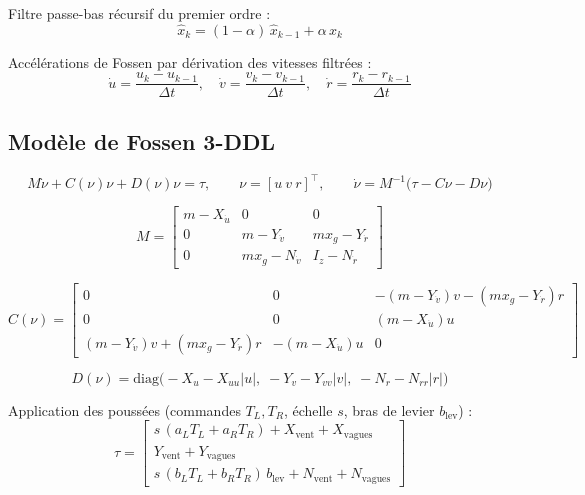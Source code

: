 \documentclass{rapportEILCO}
\begin{document}
\begin{appendix}
		Filtre passe-bas récursif du premier ordre :
		\begin{equation}
			\hat{x}_{k} = (1-\alpha)\,\hat{x}_{k-1} + \alpha\, x_{k}
			\label{eq:lpf}
		\end{equation}
		
		Accélérations de Fossen par dérivation des vitesses filtrées :
		\begin{equation}
			\dot{u} = \frac{u_{k}-u_{k-1}}{\Delta t},\quad
			\dot{v} = \frac{v_{k}-v_{k-1}}{\Delta t},\quad
			\dot{r} = \frac{r_{k}-r_{k-1}}{\Delta t}
			\label{eq:accels}
		\end{equation}
		
		\subsection{Modèle de Fossen 3-DDL}
		\label{app:fossen}
		
		\begin{equation}
			M\dot{\nu} + C(\nu)\nu + D(\nu)\nu = \tau,\qquad
			\nu=[u\ v\ r]^{\top},\qquad
			\dot{\nu} = M^{-1}\big(\tau - C\nu - D\nu\big)
			\label{eq:fossen}
		\end{equation}
		
		\begin{equation}
			M=\begin{bmatrix}
				m-X_{\dot{u}} & 0 & 0\\
				0 & m-Y_{\dot{v}} & m x_{g}-Y_{\dot{r}}\\
				0 & m x_{g}-N_{\dot{v}} & I_{z}-N_{\dot{r}}
			\end{bmatrix}
			\label{eq:M}
		\end{equation}
		
		\begin{equation}
			C(\nu)=\begin{bmatrix}
				0 & 0 & -(m-Y_{\dot{v}})v-(m x_{g}-Y_{\dot{r}})r\\
				0 & 0 & (m-X_{\dot{u}})u\\
				(m-Y_{\dot{v}})v+(m x_{g}-Y_{\dot{r}})r & -(m-X_{\dot{u}})u & 0
			\end{bmatrix}
			\label{eq:C}
		\end{equation}
		
		\begin{equation}
			D(\nu)=\mathrm{diag}\big(
			-X_{u}-X_{uu}|u|,\;
			-Y_{v}-Y_{vv}|v|,\;
			-N_{r}-N_{rr}|r|
			\big)
			\label{eq:D}
		\end{equation}
		
		Application des poussées (commandes $T_{L},T_{R}$, échelle $s$, bras de levier $b_{\mathrm{lev}}$) :
		\begin{equation}
			\tau=\begin{bmatrix}
				s\,(a_{L}T_{L}+a_{R}T_{R}) + X_{\mathrm{vent}}+X_{\mathrm{vagues}}\\
				Y_{\mathrm{vent}}+Y_{\mathrm{vagues}}\\
				s\,(b_{L}T_{L}+b_{R}T_{R})\,b_{\mathrm{lev}} + N_{\mathrm{vent}}+N_{\mathrm{vagues}}
			\end{bmatrix}
			\label{eq:tau}
		\end{equation}
		

\end{appendix}
\end{document}
